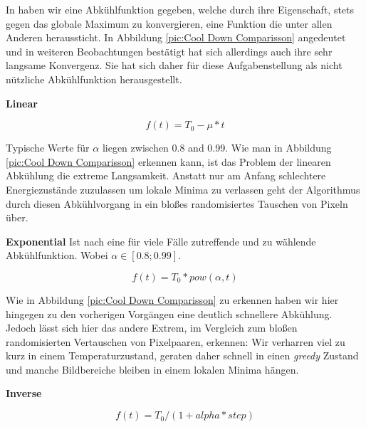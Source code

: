 In \cite{hajek1988cooling} haben wir eine Abkühlfunktion gegeben, welche durch ihre Eigenschaft,
stets gegen das globale Maximum zu konvergieren, eine Funktion die unter allen Anderen heraussticht.
In Abbildung \ref{pic:Cool Down Comparisson} angedeutet und in weiteren Beobachtungen bestätigt hat sich 
allerdings auch ihre sehr langsame Konvergenz.
Sie hat sich daher für diese Aufgabenstellung als nicht nützliche Abkühlfunktion herausgestellt.

\textbf{Linear}
\begin{tcolorbox}[rightrule=3mm, rounded corners=east]
    \begin{equation}\label{eq:lineare Abkühlung}
        f(t) = T_0 - \mu*t
    \end{equation}
\end{tcolorbox}

Typische Werte für $\alpha$ liegen zwischen 0.8 and 0.99. Wie man in Abbildung \ref{pic:Cool Down Comparisson}
erkennen kann, ist das Problem der linearen Abkühlung die extreme Langsamkeit.
Anstatt nur am Anfang schlechtere Energiezustände zuzulassen um lokale Minima zu verlassen 
geht der Algorithmus durch diesen Abkühlvorgang in ein bloßes randomisiertes Tauschen von Pixeln über.

\textbf{Exponential}
Ist nach \cite{Kirkpatrick671} eine für viele Fälle zutreffende und zu wählende Abkühlfunktion.
Wobei $\alpha \in [0.8; 0.99]$.

\begin{tcolorbox}[rightrule=3mm, rounded corners=east]
    \begin{equation}\label{eq:Exponential}
        f(t) = T_0*pow(\alpha,t)
    \end{equation}
\end{tcolorbox}

Wie in Abbildung \ref{pic:Cool Down Comparisson} zu erkennen haben wir hier hingegen zu den vorherigen Vorgängen
eine deutlich schnellere Abkühlung. Jedoch lässt sich hier das andere Extrem, im Vergleich zum bloßen randomisierten
Vertauschen von Pixelpaaren, erkennen: Wir verharren viel zu kurz in einem Temperaturzustand, geraten daher schnell 
in einen \textit{greedy} Zustand und manche Bildbereiche bleiben in einem lokalen Minima hängen.

\textbf{Inverse}

\begin{tcolorbox}[rightrule=3mm, rounded corners=east]
    \begin{equation}\label{eq:Inverse}
        f(t) = T_0 / (1 + alpha * step)
    \end{equation}
\end{tcolorbox}

